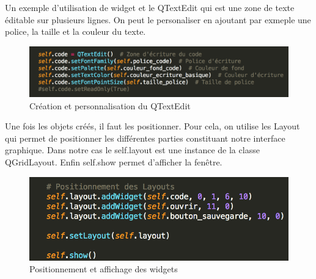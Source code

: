 \documentclass[a4paper,12pt]{article}
\begin{document}
		Un exemple d'utilisation de widget et le QTextEdit qui est une zone de texte éditable sur plusieurs lignes. On peut le personaliser en ajoutant par exmeple une police, la taille et la couleur du texte.

		\begin{figure}[!h]

			\begin{center}

				\includegraphics[scale=0.8]{"images/QTextEdit"}

				\caption{Création et personnalisation du QTextEdit}
			\end{center}

		\end{figure}

		Une fois les objets créés, il faut les positionner. Pour cela, on utilise les Layout qui permet de positionner les différentes parties constituant notre interface graphique. Dans notre cas le self.layout est une instance de la classe QGridLayout. Enfin self.show permet d'afficher la fenêtre. 

		\begin{figure}[!h]

			\begin{center}

				\includegraphics[scale=0.8]{"images/Layout"}

				\caption{Positionnement et affichage des widgets}
			\end{center}

		\end{figure}

		
\end{document}
